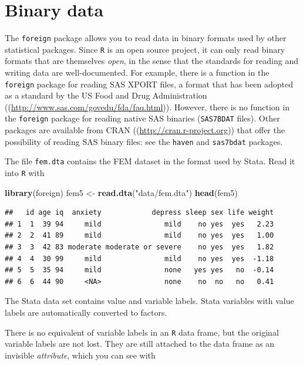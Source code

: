 \documentclass[
]{book}
\newenvironment{Shaded}{\begin{snugshade}}{\end{snugshade}}
\newcommand{\FunctionTok}[1]{\textcolor[rgb]{0.13,0.29,0.53}{\textbf{#1}}}
\newcommand{\NormalTok}[1]{#1}
\newcommand{\OtherTok}[1]{\textcolor[rgb]{0.56,0.35,0.01}{#1}}
\newcommand{\StringTok}[1]{\textcolor[rgb]{0.31,0.60,0.02}{#1}}
\newcounter{none} %
\begin{document}
\section{Binary data}\label{binary-data}

The \texttt{foreign} package allows you to read data in binary formats
used by other statistical packages. Since \texttt{R} is an open source
project, it can only read binary formats that are themselves \emph{open},
in the sense that the standards for reading and writing data are
well-documented. For example, there is a function in the
\texttt{foreign} package for reading SAS XPORT files, a format that
has been adopted as a standard by the US Food and Drug Administration
((\url{http://www.sas.com/govedu/fda/faq.html})). However, there is no
function in the \texttt{foreign} package for reading native SAS
binaries (\texttt{SAS7BDAT} files). Other packages are available from
CRAN ((\url{http://cran.r-project.org})) that offer the possibility of
reading SAS binary files: see the \texttt{haven} and \texttt{sas7bdat}
packages.

The file \texttt{fem.dta} contains the FEM dataset in the format
used by Stata. Read it into \texttt{R} with

\begin{Shaded}
\begin{Highlighting}[]
\FunctionTok{library}\NormalTok{(foreign)}
\NormalTok{fem5 }\OtherTok{\textless{}{-}} \FunctionTok{read.dta}\NormalTok{(}\StringTok{"data/fem.dta"}\NormalTok{)}
\FunctionTok{head}\NormalTok{(fem5)}
\end{Highlighting}
\end{Shaded}

\begin{verbatim}
##   id age iq  anxiety            depress sleep sex life weight
## 1  1  39 94     mild               mild    no yes  yes   2.23
## 2  2  41 89     mild               mild    no yes  yes   1.00
## 3  3  42 83 moderate moderate or severe    no yes  yes   1.82
## 4  4  30 99     mild               mild    no yes  yes  -1.18
## 5  5  35 94     mild               none   yes yes   no  -0.14
## 6  6  44 90     <NA>               none    no  no   no   0.41
\end{verbatim}

The Stata data set contains value and variable labels.
Stata variables with value labels are automatically converted to
factors.

There is no equivalent of variable labels in an \texttt{R} data frame,
but the original variable labels are not lost. They are still attached
to the data frame as an invisible \emph{attribute}, which you can see
with
\end{document}

